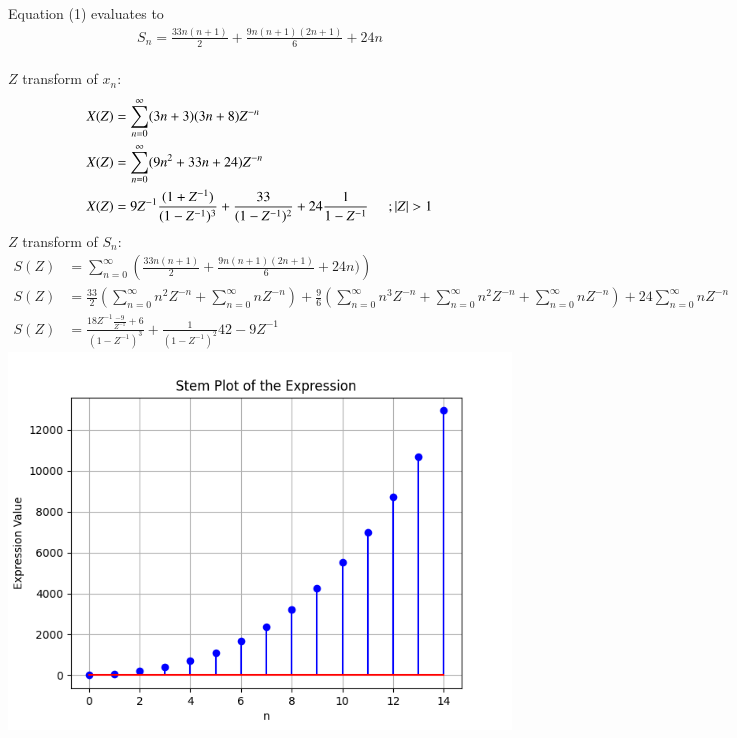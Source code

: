 \documentclass[journal,12pt,twocolumn]{IEEEtran}
\theoremstyle{remark}
\begin{document}
        
        Equation (1) evaluates to
        \\
             \begin{align*}
                S_n=\frac{33n(n+1)}{2} + \frac{9n(n+1)(2n+1)}{6} + 24n
            \end{align*}
        \\
        $Z$ transform of $x_n$:
        \begin{align*}
            X(Z) &= \sum_{n=0}^{\infty} (3n+3)(3n+8)Z^{-n} \\
            X(Z) &= \sum_{n=0}^{\infty} (9n^2 +33n+24)Z^{-n} \\
            X(Z)&=9Z^{-1}\frac{(1+Z^{-1})}{(1-Z^{-1})^3} + \frac{33}{(1-Z^{-1})^2} +24\frac{1}{1-Z^{-1}} \hspace{0.5cm}; |Z|>1
        \end{align*}
        $Z$ transform of $S_n$:
        \begin{align*}
            S(Z)&= \sum_{n=0}^{\infty} \left( \frac{33n(n+1)}{2}+\frac{9n(n+1)(2n+1)}{6} +24n) \right) \\
            S(Z)&= \frac{33}{2} \left( \sum_{n=0}^{\infty} n^2Z^{-n} + \sum_{n=0}^{\infty} nZ^{-n} \right) + \frac{9}{6} \left( \sum_{n=0}^{\infty} n^3Z^{-n} + \sum_{n=0}^{\infty} n^2Z^{-n} + \sum_{n=0}^{\infty}nZ^{-n} \right) + 24\sum_{n=0}^{\infty} nZ^{-n} \\
            S(Z)&= \frac{18Z^{-1}\frac{-9}{Z^{-1}}+6}{(1-Z^{-1})^3} + \frac{1}{(1-Z^{-1})^2}{42-9Z^{-1}}
        \end{align*}
        \includegraphics[width=\columnwidth]{images/plot.png}

        
            
           
             
             
             
        

        













\renewcommand{\thefigure}{\theenumi}
\renewcommand{\thetable}{\theenumi}
\end{document}
